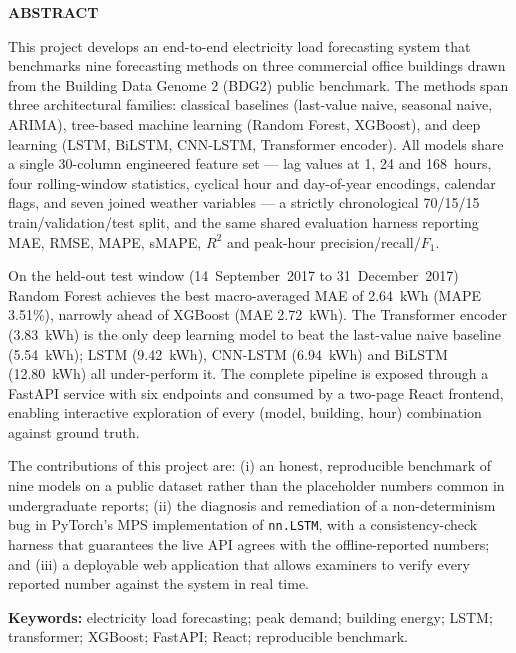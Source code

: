 \documentclass[12pt,a4paper,openany]{report}
\begin{document}
\newpage

\begin{center}
\textbf{ABSTRACT}
\end{center}
\vspace{10pt}

This project develops an end-to-end electricity load forecasting system that benchmarks nine forecasting methods on three commercial office buildings drawn from the Building Data Genome 2 (BDG2) public benchmark. The methods span three architectural families: classical baselines (last-value naive, seasonal naive, ARIMA), tree-based machine learning (Random Forest, XGBoost), and deep learning (LSTM, BiLSTM, CNN-LSTM, Transformer encoder). All models share a single 30-column engineered feature set --- lag values at 1, 24 and 168~hours, four rolling-window statistics, cyclical hour and day-of-year encodings, calendar flags, and seven joined weather variables --- a strictly chronological 70/15/15 train/validation/test split, and the same shared evaluation harness reporting MAE, RMSE, MAPE, sMAPE, $R^2$ and peak-hour precision/recall/$F_1$.

On the held-out test window (14~September~2017 to 31~December~2017) Random Forest achieves the best macro-averaged MAE of 2.64~kWh (MAPE 3.51\%), narrowly ahead of XGBoost (MAE 2.72~kWh). The Transformer encoder (3.83~kWh) is the only deep learning model to beat the last-value naive baseline (5.54~kWh); LSTM (9.42~kWh), CNN-LSTM (6.94~kWh) and BiLSTM (12.80~kWh) all under-perform it. The complete pipeline is exposed through a FastAPI service with six endpoints and consumed by a two-page React frontend, enabling interactive exploration of every (model, building, hour) combination against ground truth.

The contributions of this project are: (i) an honest, reproducible benchmark of nine models on a public dataset rather than the placeholder numbers common in undergraduate reports; (ii) the diagnosis and remediation of a non-determinism bug in PyTorch's MPS implementation of \texttt{nn.LSTM}, with a consistency-check harness that guarantees the live API agrees with the offline-reported numbers; and (iii) a deployable web application that allows examiners to verify every reported number against the system in real time.

\vspace{6pt}
\noindent\textbf{Keywords:} electricity load forecasting; peak demand; building energy; LSTM; transformer; XGBoost; FastAPI; React; reproducible benchmark.
\end{document}
